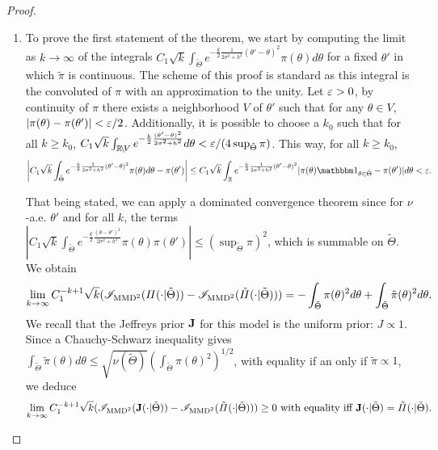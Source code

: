 \begin{proof}
\begin{enumerate}
    \item To prove the first statement of the theorem, 
    we start by  computing the limit as $k\to\infty$ of the integrals  $C_1\sqrt{k}\int_{\tilde\Theta}e^{-\frac{k}{2}\frac{1}{2\sigma^2+h^2}(\theta'-\theta)^2}\pi(\theta)d\theta $ for a fixed $\theta'$ in which $\tilde\pi$ is continuous. The scheme of this proof is standard as this integral is the convoluted of  $\pi$ with an approximation to the unity. Let $\varepsilon>0$, by continuity of $\pi$ there exists a neighborhood $V$ of $\theta'$ such that for any $\theta\in V$,  $|\pi(\theta)-\pi(\theta')|<\varepsilon/2$. %
    Additionally, it is possible to choose a $k_0$ such that for all $k\geq k_0$, $C_1\sqrt{k}\int_{\mathbb{R}\!\setminus\!V} e^{-\frac{k}{2}\frac{(\theta'-\theta)^2}{2\sigma^2+h^2}}d\theta <\varepsilon/(4\sup_{\tilde\Theta}\pi)$. This way, for all $k\geq k_0$,
        \begin{equation}
            \left|C_1\sqrt{k}\int_{\tilde\Theta}e^{-\frac{k}{2}\frac{1}{2\sigma^2+h^2}(\theta'-\theta)^2}\pi(\theta)d\theta -\pi(\theta')  \right| \leq C_1\sqrt{k}\int_{\RR}e^{-\frac{k}{2}\frac{1}{2\sigma^2+h^2}(\theta'-\theta)^2} |\pi(\theta)\indic_{\theta\in\tilde\Theta}-\pi(\theta')|d\theta 
            <\eps.
        \end{equation}
    
    That being stated, we can apply a dominated convergence theorem since for $\nu$-a.e. $\theta'$ and for all $k$, the terms $|C_1\sqrt{k}\int_{\tilde\Theta} e^{-\frac{k}{2}\frac{(\theta-\theta')^2}{2\sigma^2+h^2}}\pi(\theta)\pi(\theta') |\leq(\sup_{\tilde\Theta}\pi)^2$, which is summable on $\tilde\Theta$.
    We obtain
    \begin{equation}
        \lim_{k\rightarrow\infty} C_1^{-k+1}\sqrt{k}(\mathscr{I}_{\text{MMD}^2}(\varPi(\cdot|\tilde\Theta))-\mathscr{I}_{\text{MMD}^2}(\tilde\varPi(\cdot|\tilde\Theta)) ) = -\int_{\tilde\Theta}\pi(\theta)^2d\theta + \int_{\tilde\Theta}\tilde\pi(\theta)^2d\theta.
    \end{equation}
    We recall that the Jeffreys prior $\mathbf{J} $ for this model is the uniform prior: $J\propto 1$.
    Since a Chauchy-Schwarz inequality gives $\int_{\tilde\Theta}\tilde\pi(\theta)d\theta \leq \sqrt{\nu(\tilde\Theta)} \left(\int_{\tilde\Theta}\pi(\theta)^2 \right)^{1/2}$, with equality if an only if $\tilde\pi\propto 1$, we deduce 
    \begin{equation}
        \lim_{k\rightarrow\infty} C_1^{-k+1}\sqrt{k}(\mathscr{I}_{\text{MMD}^2}(\mathbf{J}(\cdot|\tilde\Theta))-\mathscr{I}_{\text{MMD}^2}(\tilde\varPi(\cdot|\tilde\Theta)) ) \geq 0 \text{\ with equality iff\ }\mathbf{J}(\cdot|\tilde\Theta) = \tilde\varPi(\cdot|\tilde\Theta).
    \end{equation}


\end{enumerate}
\end{proof}
